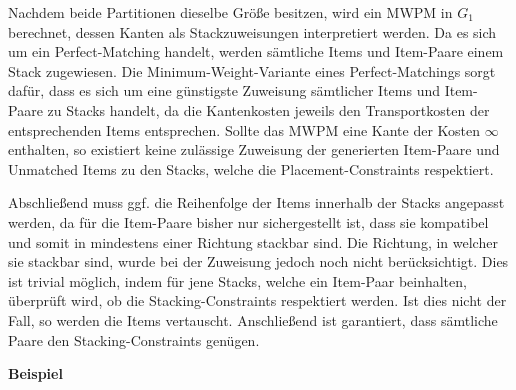 Nachdem beide Partitionen dieselbe Größe besitzen, wird ein \textsc{MWPM} in $G_1$ berechnet, dessen Kanten als
Stackzuweisungen interpretiert werden. Da es sich um ein Perfect-Matching handelt, werden sämtliche Items und Item-Paare einem Stack zugewiesen. Die Minimum-Weight-Variante eines Perfect-Matchings sorgt dafür, dass es sich um eine günstigste Zuweisung sämtlicher Items und Item-Paare zu Stacks handelt, da die Kantenkosten jeweils den Transportkosten der entsprechenden Items entsprechen. Sollte das \textsc{MWPM} eine Kante der Kosten $\infty$ enthalten, so existiert keine zulässige Zuweisung der generierten Item-Paare und Unmatched Items zu den Stacks, welche die Placement-Constraints respektiert.

Abschließend muss ggf. die Reihenfolge der Items innerhalb der Stacks angepasst werden, da für die Item-Paare bisher nur sichergestellt ist,
dass sie kompatibel und somit in mindestens einer Richtung stackbar sind. Die Richtung, in welcher sie stackbar sind, wurde bei der Zuweisung
jedoch noch nicht berücksichtigt. Dies ist trivial möglich, indem für jene Stacks, welche ein Item-Paar beinhalten,
überprüft wird, ob die Stacking-Constraints respektiert werden. Ist dies nicht der Fall, so werden die Items vertauscht.
Anschließend ist garantiert, dass sämtliche Paare den Stacking-Constraints genügen.

\pagebreak

\textbf{Beispiel}

